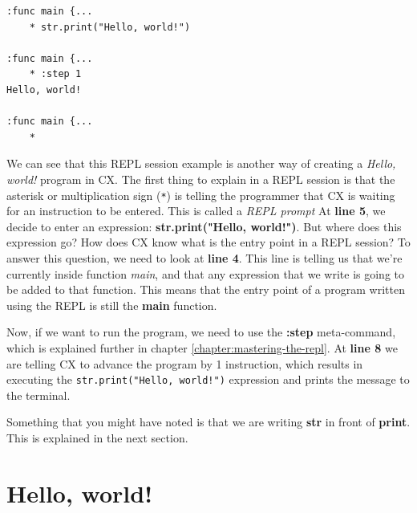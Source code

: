 \documentclass[11pt,fleqn,openany]{book} %
\begin{document}
\begin{lstlisting}[caption={REPL session example},captionpos=b,label={listing:repl-example-1}]
:func main {...
	* str.print("Hello, world!")

:func main {...
	* :step 1
Hello, world!

:func main {...
	* 
\end{lstlisting}

We can see that this REPL session example is another way of creating a \textit{Hello, world!} program in CX. The first thing to explain in a REPL session is that the asterisk or multiplication sign (\lstinline{*}) is telling the programmer that CX is waiting for an instruction to be entered. This is called a \textit{REPL prompt} At \textbf{line 5}, we decide to enter an expression: \textbf{str.print("Hello, world!")}. But where does this expression go? How does CX know what is the entry point in a REPL session? To answer this question, we need to look at \textbf{line 4}. This line is telling us that we're currently inside function \emph{main}, and that any expression that we write is going to be added to that function. This means that the entry point of a program written using the REPL is still the \textbf{main} function.

Now, if we want to run the program, we need to use the \textbf{:step} meta-command, which is explained further in chapter \ref{chapter:mastering-the-repl}. At \textbf{line 8} we are telling CX to advance the program by 1 instruction, which results in executing the \lstinline{str.print("Hello, world!")} expression and prints the message to the terminal.

Something that you might have noted is that we are writing \textbf{str} in front of \textbf{print}. This is explained in the next section.

\section{Hello, world!}
\label{subsection:hello-world}

\end{document}
